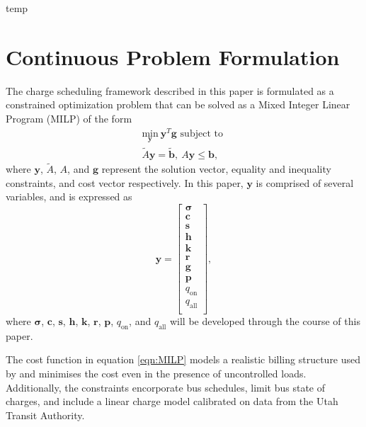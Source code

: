 \newpage temp \newpage
\section{Continuous Problem Formulation\label{sec:4_formulation}}
The charge scheduling framework described in this paper is formulated as a constrained optimization problem that can be solved as a Mixed Integer Linear Program (MILP) of the form
\begin{equation}\label{eqn:MILP}\begin{matrix}
	\underset{\mathbf{y}}{\text{min}} \ \mathbf{y}^T\mathbf{g} \text{ subject to } \\
	\tilde{A}\mathbf{y} = \tilde{\mathbf{b}}, \ A\mathbf{y} \le \mathbf{b},
\end{matrix} \end{equation}
where $\mathbf{y}$, $\tilde{A}$, $A$, and $\mathbf{g}$ represent the solution vector, equality and inequality constraints, and cost vector respectively. In this paper, $\mathbf{y}$ is comprised of several variables, and is expressed as 
\begin{equation}
	\mathbf{y} = \begin{bmatrix}
			\mathbf{\sigma} \\ 
			\mathbf{c}      \\ 
			\mathbf{s}      \\ 
			\mathbf{h}      \\ 
			\mathbf{k}      \\ 
			\mathbf{r}      \\ 
			\mathbf{g}      \\
			\mathbf{p}      \\ 
			q_{\text{on}}   \\ 
			q_{\text{all}}  \\
		     \end{bmatrix},
\end{equation}
where $\mathbf{\sigma}$, $\mathbf{c}$, $\mathbf{s}$, $\mathbf{h}$, $\mathbf{k}$, $\mathbf{r}$, $\mathbf{p}$, $q_{\text{on}}$, and $q_{\text{all}}$ will be developed through the course of this paper.
\par The cost function in equation \ref{eqn:MILP} models a realistic billing structure used by \cite{rocky_mountain_power_rocky_2021} and minimises the cost even in the presence of uncontrolled loads. Additionally, the constraints encorporate bus schedules, limit bus state of charges, and include a linear charge model calibrated on data from the Utah Transit Authority.
